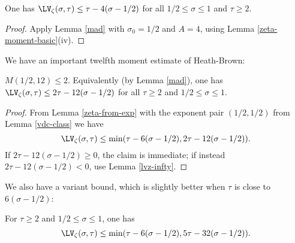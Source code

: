 \begin{corollary}\label{lvz-4} One has $\LV_\zeta(\sigma,\tau) \leq \tau - 4 (\sigma-1/2)$ for all $1/2 \leq \sigma \leq 1$ and $\tau \geq 2$.
\end{corollary}

\begin{proof} Apply Lemma \ref{mad} with $\sigma_0 = 1/2$ and $A=4$, using Lemma \ref{zeta-moment-basic}(iv).
\end{proof}

We have an important twelfth moment estimate of Heath-Brown:

\begin{theorem}\label{hb-12}\cite{heathbrown_twelfth_1978} $M(1/2,12) \leq 2$.  Equivalently (by Lemma \ref{mad}), one has $\LV_\zeta(\sigma,\tau) \leq 2\tau - 12 (\sigma-1/2)$ for all $\tau \geq 2$ and $1/2 \leq \sigma \leq 1$.
\end{theorem}

\begin{proof}  From Lemma \ref{zeta-from-exp} with the exponent pair $(1/2,1/2)$ from Lemma \ref{vdc-class} we have
$$ \LV_\zeta(\sigma,\tau) \leq \min( \tau - 6(\sigma-1/2), 2\tau - 12 (\sigma-1/2) ).$$
If $2\tau - 12 (\sigma-1/2)  \geq 0$, the claim is immediate; if instead $2\tau - 12 (\sigma-1/2) < 0$, use Lemma \ref{lvz-infty}. 
\end{proof}

We also have a variant bound, which is slightly better when $\tau$ is close to $6(\sigma-1/2)$:

\begin{theorem}  For $\tau \geq 2$ and $1/2 \leq \sigma \leq 1$, one has
$$ \LV_\zeta(\sigma,\tau) \leq \min( \tau-6(\sigma-1/2), 5\tau-32(\sigma-1/2)).$$
\end{theorem}

